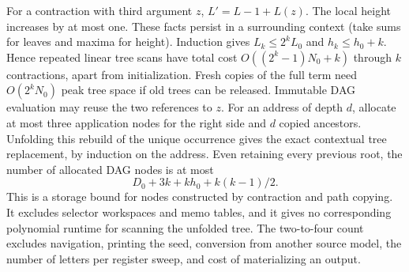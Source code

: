 For a contraction with third argument \(z\), \(L'=L-1+L(z)\). The local height increases by at most one. These facts persist in a surrounding context (take sums for leaves and maxima for height). Induction gives \(L_k\le 2^k L_0\) and \(h_k\le h_0+k\). Hence repeated linear tree scans have total cost \(O((2^k-1)N_0+k)\) through \(k\) contractions, apart from initialization. Fresh copies of the full term need \(O(2^k N_0)\) peak tree space if old trees can be released. Immutable DAG evaluation may reuse the two references to \(z\). For an address of depth \(d\), allocate at most three application nodes for the right side and \(d\) copied ancestors. Unfolding this rebuild of the unique occurrence gives the exact contextual tree replacement, by induction on the address. Even retaining every previous root, the number of allocated DAG nodes is at most
\[
 D_0+3k+k h_0+k(k-1)/2 .
\]
This is a storage bound for nodes constructed by contraction and path copying. It excludes selector workspaces and memo tables, and it gives no corresponding polynomial runtime for scanning the unfolded tree. The two-to-four count excludes navigation, printing the seed, conversion from another source model, the number of letters per register sweep, and cost of materializing an output.
